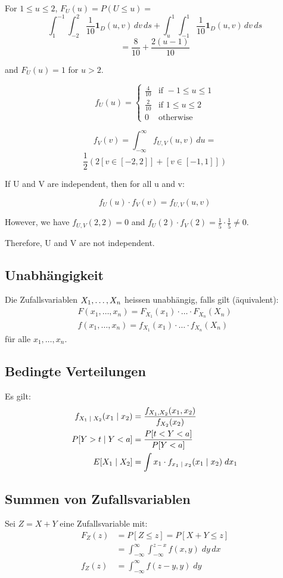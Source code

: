 For $1 \leq u \leq 2$, $F_U(u) = P(U \leq u) =$
\[
\int_1^{-1} \int_{-2}^{2} \frac{1}{10} \mathbf{1}_D(u, v) \, dv \, ds + \int_u^1 \int_{-1}^{1} \frac{1}{10} \mathbf{1}_D(u, v) \, dv \, ds
\]
\[
  = \frac{8}{10} + \frac{2(u - 1)}{10}
\]

and $F_U(u) = 1$ for $u > 2$.

\[
f_U(u) = \begin{cases}
\frac{4}{10} & \text{if } -1 \leq u \leq 1 \\
\frac{2}{10} & \text{if } 1 \leq u \leq 2 \\
0 & \text{otherwise}
\end{cases}
\]

\[
f_V(v) = \int_{-\infty}^{\infty} f_{U,V}(u,v) \, du = 
\]
\[
\frac{1}{2}\left(2[v \in [-2,2]] + [v \in [-1,1]]\right)
\]

If U and V are independent, then for all u and v:

\[
f_U(u) \cdot f_V(v) = f_{U,V}(u,v)
\]

However, we have \(f_{U,V}(2,2) = 0\) and \(f_U(2) \cdot f_V(2) = \frac{1}{5} \cdot \frac{1}{5} \neq 0\).

Therefore, U and V are not independent.

\BoxEnd{}
\subsection*{Unabhängigkeit}
Die Zufallsvariablen $X_1, \dots, X_n$ heissen unabhängig, falls gilt
(äquivalent):
\begin{align*}
  F (x_1, \dots, x_n) = F_{X_1} (x_1) \cdot \hdots \cdot F_{X_n} (X_n) \\
  f (x_1, \dots, x_n) = f_{X_1} (x_1) \cdot \hdots \cdot f_{X_n} (X_n)
\end{align*}
für alle $x_1, \dots, x_n$.
\subsection*{Bedingte Verteilungen}
Es gilt:
\begin{align*}
  f_{X_1 \; | \; X_2} (x_1 \; | \; x_2) & = \frac{f_{X_1,  X_2} (x_1,  x_2)}{f_{X_2} (x_2)}              \\
  P[Y > t \; | \; Y < a]                   & = \frac{P[t < Y < a]}{P[Y < a]}                                \\
  E[X_1 \; | \; X_2]                    & = \int x_1 \cdot f_{x_1 \; | \; x_2} (x_1 \; | \; x_2) \; dx_1
\end{align*}
\subsection*{Summen von Zufallsvariablen}
Sei $Z = X + Y$ eine Zufallsvariable mit:
\begin{align*}
  F_Z (z) & = P[Z \leq z] = P[X + Y \leq z]                                     \\
          & = \int_{-\infty}^\infty \int_{-\infty}^{z - x} f (x, y )\; dy \, dx \\
  f_Z (z) & = \int_{-\infty}^\infty f (z - y, y) \; dy
\end{align*}
